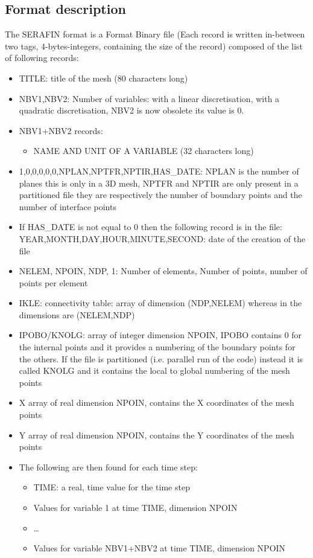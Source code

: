 \subsection{Format description}
%
The SERAFIN format is a Format Binary file (Each record is written in-between
two tags, 4-bytes-integers, containing the size of the record) composed of
the list of following records:
\begin{itemize}
\item TITLE: title of the mesh (80 characters long)
\item NBV1,NBV2: Number of variables: with a linear discretisation, with a
quadratic discretisation, NBV2 is now obsolete its value is 0.
\item NBV1+NBV2 records:
\begin{itemize}
\item NAME AND UNIT OF A VARIABLE (32 characters long)
\end{itemize}
\item 1,0,0,0,0,0,NPLAN,NPTFR,NPTIR,HAS\_DATE: NPLAN is the number of planes
this is only in a 3D mesh, NPTFR and NPTIR are only present in a partitioned
file they are respectively the number of boundary points and the number of
interface points
\item If HAS\_DATE is not equal to 0 then the following record is in the
file:\\ YEAR,MONTH,DAY,HOUR,MINUTE,SECOND: date of the creation of the file
\item NELEM, NPOIN, NDP, 1: Number of elements, Number of points, number of
points per element
\item IKLE: connectivity table: array of dimension (NDP,NELEM) whereas in
\telemacsystem the dimensions are (NELEM,NDP)
\item IPOBO/KNOLG: array of integer dimension NPOIN, IPOBO contains 0 for the
internal points and it provides a numbering of the boundary points for the
others. If the file is partitioned (i.e. parallel run of the code) instead it
is called KNOLG and it contains the local to global numbering of the mesh
points
\item X array of real dimension NPOIN, contains the X coordinates of the mesh
points
\item Y array of real dimension NPOIN, contains the Y coordinates of the mesh
points
\item The following are then found for each time step:
\begin{itemize}
\item TIME: a real, time value for the time step
\item Values for variable 1 at time TIME, dimension NPOIN
\item \ldots
\item Values for variable NBV1+NBV2 at time TIME, dimension NPOIN
\end{itemize}
\end{itemize}


